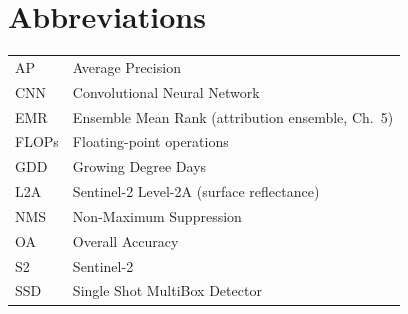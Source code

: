 \chapter*{Abbreviations}
\begin{tabular}{@{}ll@{}}
AP   & Average Precision \\
CNN  & Convolutional Neural Network \\
EMR  & Ensemble Mean Rank (attribution ensemble, Ch.~5) \\
FLOPs& Floating-point operations \\
GDD  & Growing Degree Days \\
L2A  & Sentinel-2 Level-2A (surface reflectance) \\
NMS  & Non-Maximum Suppression \\
OA   & Overall Accuracy \\
S2   & Sentinel-2 \\
SSD  & Single Shot MultiBox Detector \\
\end{tabular}
